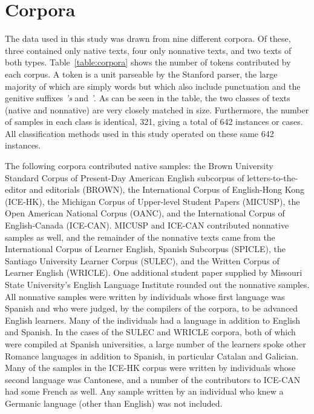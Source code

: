 \documentclass[main.tex]{subfiles}
\begin{document}
\section{Corpora}

The data used in this study was drawn from nine different corpora. Of these, three contained only native texts, four only nonnative texts, and two texts of both types. Table~\ref{table:corpora} shows the number of tokens contributed by each corpus. A token is a unit parseable by the Stanford parser, the large majority of which are simply words but which also include punctuation and the genitive suffixes \textit{'s} and \textit{'}. As can be seen in the table, the two classes of texts (native and nonnative) are very closely matched in size. Furthermore, the number of samples in each class is identical, 321, giving a total of 642 instances or cases. All classification methods used in this study operated on these same 642 instances.

The following corpora contributed native samples: the Brown University Standard Corpus of Present-Day American English subcorpus of letters-to-the-editor and editorials (BROWN), the International Corpus of English-Hong Kong (ICE-HK), the Michigan Corpus of Upper-level Student Papers (MICUSP), the Open American National Corpus (OANC), and the International Corpus of English-Canada (ICE-CAN). MICUSP and ICE-CAN contributed nonnative samples as well, and the remainder of the nonnative texts came from the International Corpus of Learner English, Spanish Subcorpus (SPICLE), the Santiago University Learner Corpus (SULEC), and the Written Corpus of Learner English (WRICLE). One additional student paper supplied by Missouri State University's English Language Institute rounded out the nonnative samples. All nonnative samples were written by individuals whose first language was Spanish and who were judged, by the compilers of the corpora, to be advanced English learners. Many of the individuals had a language in addition to English and Spanish. In the cases of the SULEC and WRICLE corpora, both of which were compiled at Spanish universities, a large number of the learners spoke other Romance languages in addition to Spanish, in particular Catalan and Galician. Many of the samples in the ICE-HK corpus were written by individuals whose second language was Cantonese, and a number of the contributors to ICE-CAN had some French as well. Any sample written by an individual who knew a Germanic language (other than English) was not included.
\end{document}
